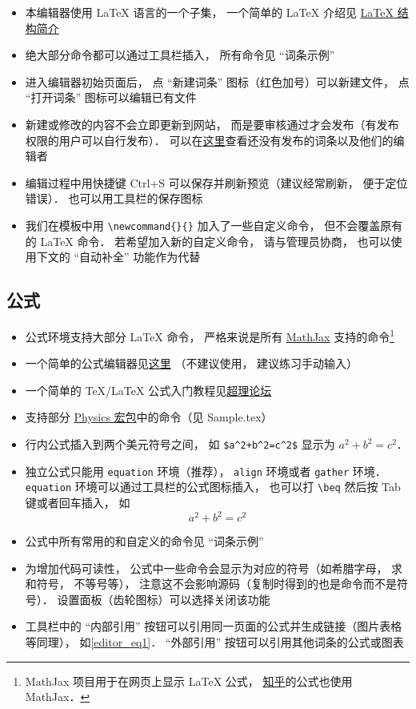 \begin{itemize}
\item 本编辑器使用 LaTeX 语言的一个子集， 一个简单的 LaTeX 介绍见 \href{http://wuli.wiki/online/latxIn.html}{LaTeX 结构简介}
\item 绝大部分命令都可以通过工具栏插入， 所有命令见 “词条示例”
\item 进入编辑器初始页面后， 点 “新建词条” 图标（红色加号）可以新建文件， 点 “打开词条” 图标可以编辑已有文件
\item 新建或修改的内容不会立即更新到网站， 而是要审核通过才会发布（有发布权限的用户可以自行发布）． 可以在\href{http://wuli.wiki/changed/changed.html}{这里}查看还没有发布的词条以及他们的编辑者
\item 编辑过程中用快捷键 Ctrl+S 可以保存并刷新预览（建议经常刷新， 便于定位错误）． 也可以用工具栏的保存图标
\item 我们在模板中用 \verb|\newcommand{}{}| 加入了一些自定义命令， 但不会覆盖原有的 LaTeX 命令． 若希望加入新的自定义命令， 请与管理员协商， 也可以使用下文的 “自动补全” 功能作为代替
\end{itemize}

\subsection{公式}
\begin{itemize}
\item 公式环境支持大部分 LaTeX 命令， 严格来说是所有 \href{https://www.mathjax.org/}{MathJax} 支持的命令\footnote{MathJax 项目用于在网页上显示 LaTeX 公式， \href{https://www.zhihu.com/}{知乎}的公式也使用 MathJax．}
\item 一个简单的公式编辑器见\href{https://www.codecogs.com/latex/eqneditor.php}{这里} （不建议使用， 建议练习手动输入）
\item 一个简单的 TeX/LaTeX 公式入门教程见\href{https://chaoli.club/index.php/211}{超理论坛}
\item 支持部分 \href{http://mirrors.ibiblio.org/CTAN/macros/latex/contrib/physics/physics.pdf}{Physics 宏包}中的命令（见 Sample.tex）
\item 行内公式插入到两个美元符号之间， 如 \verb|$a^2+b^2=c^2$| 显示为 $a^2 + b^2 = c^2$．
\item 独立公式只能用 \verb|equation| 环境（推荐）， \verb|align| 环境或者 \verb|gather| 环境． \verb|equation| 环境可以通过工具栏的公式图标插入， 也可以打 \verb|\beq| 然后按 Tab 键或者回车插入， 如
\begin{equation}\label{editor_eq1}
a^2 + b^2 = c^2
\end{equation}
\item 公式中所有常用的和自定义的命令见 “词条示例”
\item 为增加代码可读性， 公式中一些命令会显示为对应的符号（如希腊字母， 求和符号， 不等号等）， 注意这不会影响源码（复制时得到的也是命令而不是符号）． 设置面板（齿轮图标）可以选择关闭该功能
\item 工具栏中的 “内部引用” 按钮可以引用同一页面的公式并生成链接（图片表格等同理）， 如\autoref{editor_eq1}． “外部引用” 按钮可以引用其他词条的公式或图表
\end{itemize}

